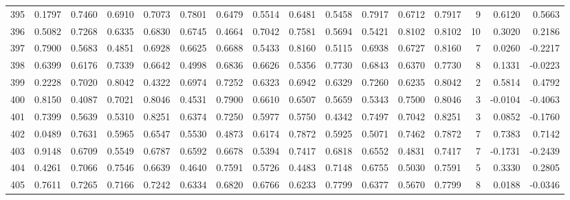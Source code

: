 \begin{tabular}{lrrrrrrrrrrrrrrr}
395 &      0.1797 &  0.7460 &  0.6910 &  0.7073 &  0.7801 &  0.6479 &  0.5514 &  0.6481 &  0.5458 &  0.7917 &   0.6712 &     0.7917 &      9 &                    0.6120 &                     0.5663 \\
396 &      0.5082 &  0.7268 &  0.6335 &  0.6830 &  0.6745 &  0.4664 &  0.7042 &  0.7581 &  0.5694 &  0.5421 &   0.8102 &     0.8102 &     10 &                    0.3020 &                     0.2186 \\
397 &      0.7900 &  0.5683 &  0.4851 &  0.6928 &  0.6625 &  0.6688 &  0.5433 &  0.8160 &  0.5115 &  0.6938 &   0.6727 &     0.8160 &      7 &                    0.0260 &                    -0.2217 \\
398 &      0.6399 &  0.6176 &  0.7339 &  0.6642 &  0.4998 &  0.6836 &  0.6626 &  0.5356 &  0.7730 &  0.6843 &   0.6370 &     0.7730 &      8 &                    0.1331 &                    -0.0223 \\
399 &      0.2228 &  0.7020 &  0.8042 &  0.4322 &  0.6974 &  0.7252 &  0.6323 &  0.6942 &  0.6329 &  0.7260 &   0.6235 &     0.8042 &      2 &                    0.5814 &                     0.4792 \\
400 &      0.8150 &  0.4087 &  0.7021 &  0.8046 &  0.4531 &  0.7900 &  0.6610 &  0.6507 &  0.5659 &  0.5343 &   0.7500 &     0.8046 &      3 &                   -0.0104 &                    -0.4063 \\
401 &      0.7399 &  0.5639 &  0.5310 &  0.8251 &  0.6374 &  0.7250 &  0.5977 &  0.5750 &  0.4342 &  0.7497 &   0.7042 &     0.8251 &      3 &                    0.0852 &                    -0.1760 \\
402 &      0.0489 &  0.7631 &  0.5965 &  0.6547 &  0.5530 &  0.4873 &  0.6174 &  0.7872 &  0.5925 &  0.5071 &   0.7462 &     0.7872 &      7 &                    0.7383 &                     0.7142 \\
403 &      0.9148 &  0.6709 &  0.5549 &  0.6787 &  0.6592 &  0.6678 &  0.5394 &  0.7417 &  0.6818 &  0.6552 &   0.4831 &     0.7417 &      7 &                   -0.1731 &                    -0.2439 \\
404 &      0.4261 &  0.7066 &  0.7546 &  0.6639 &  0.4640 &  0.7591 &  0.5726 &  0.4483 &  0.7148 &  0.6755 &   0.5030 &     0.7591 &      5 &                    0.3330 &                     0.2805 \\
405 &      0.7611 &  0.7265 &  0.7166 &  0.7242 &  0.6334 &  0.6820 &  0.6766 &  0.6233 &  0.7799 &  0.6377 &   0.5670 &     0.7799 &      8 &                    0.0188 &                    -0.0346 \\

\end{tabular}
